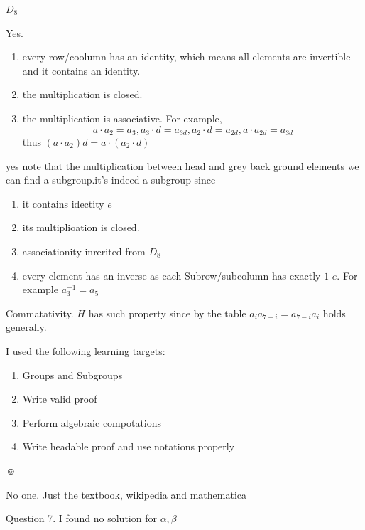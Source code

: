 \documentclass[11pt]{homework}
\begin{document}
\question
\begin{alphaparts}
    \questionpart $D_8$

    \questionpart Yes. 
    \begin{enumerate}
        \item every row/coolumn has an identity, which means all elements are invertible and it contains an identity.
        \item the multiplication is closed.
        \item the multiplication is associative. For example,
        \[a\cdot a_2=a_3, a_3\cdot d=a_{3d}, a_2\cdot d=a_{2d}, a\cdot a_{2d}=a_{3d}\]
        thus $(a\cdot a_2)d=a\cdot(a_2\cdot d)$
    \end{enumerate}

    \questionpart yes note that the multiplication between head and grey back ground elements we can find a subgroup.it's indeed a subgroup since 
    \begin{enumerate}
        \item it contains idectity $e$
        \item its multiplioation is closed.
        \item associationity inrerited from $D_8$
        \item every element has an inverse as each Subrow/subcolumn has exactly $1$ $e$. For example $a_3^{-1}=a_5$
    \end{enumerate}

    \questionpart Commatativity. $H$ has such property since by the table $a_i a_{7-i}=a_{7-i} a_i$ holds generally.
\end{alphaparts}

\setcounter{questionCounter}{11}

\question 
I used the following learning targets:
\begin{enumerate}
    \item Groups and Subgroups
	\item Write valid proof
	\item Perform algebraic compotations
	\item Write headable proof and use notations properly
\end{enumerate}

\question $\smiley$

\question No one. Just the textbook, wikipedia and mathematica

\question 
Question 7. I found no solution for $\alpha, \beta$	
\end{document}
